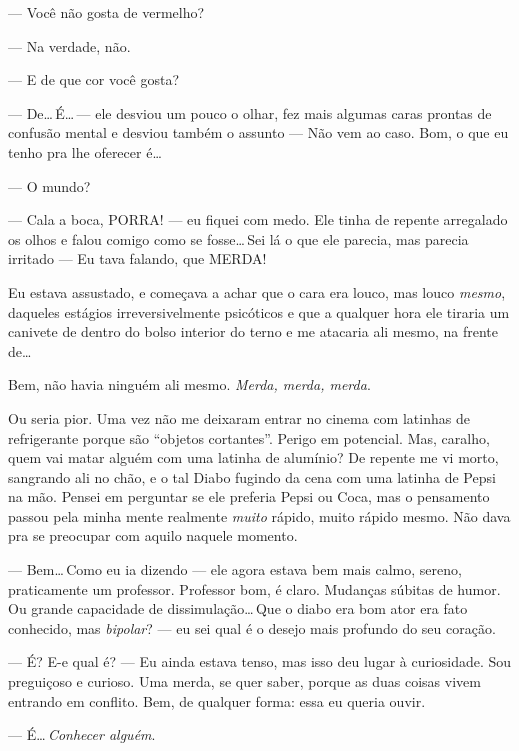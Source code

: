 --- Você não gosta de vermelho?

--- Na verdade, não.

--- E de que cor você gosta?

--- De\ldots\,É\ldots\,--- ele desviou um pouco o olhar, fez mais algumas caras prontas de confusão mental e desviou também o assunto --- Não vem ao caso. Bom, o que eu tenho pra lhe oferecer é\ldots

--- O mundo?

--- Cala a boca, PORRA! --- eu fiquei com medo. Ele tinha de repente arregalado os olhos e falou comigo como se fosse\ldots\,Sei lá o que ele parecia, mas parecia irritado --- Eu tava falando, que MERDA!

Eu estava assustado, e começava a achar que o cara era louco, mas louco \emph{mesmo}, daqueles estágios irreversivelmente psicóticos e que a qualquer hora ele tiraria um canivete de dentro do bolso interior do terno e me atacaria ali mesmo, na frente de\ldots

\begin{sloppypar}
Bem, não havia ninguém ali mesmo. \emph{Merda, merda, merda}.
\end{sloppypar}

Ou seria pior. Uma vez não me deixaram entrar no cinema com latinhas de refrigerante porque são ``objetos cortantes''. Perigo em potencial. Mas, caralho, quem vai matar alguém com uma latinha de alumínio? De repente me vi morto, sangrando ali no chão, e o tal Diabo fugindo da cena com uma latinha de Pepsi na mão. Pensei em perguntar se ele preferia Pepsi ou Coca, mas o pensamento passou pela minha mente realmente \emph{muito} rápido, muito rápido mesmo. Não dava pra se preocupar com aquilo naquele momento.

\begin{sloppypar}
--- Bem\ldots\,Como eu ia dizendo --- ele agora estava bem mais calmo, sereno, praticamente um professor. Professor bom, é claro. Mudanças súbitas de humor. Ou grande capacidade de dissimulação\ldots\,Que o diabo era bom ator era fato conhecido, mas \emph{bipolar}? --- eu sei qual é o desejo mais profundo do seu coração.
\end{sloppypar}

--- É? E-e qual é? --- Eu ainda estava tenso, mas isso deu lugar à curiosidade. Sou preguiçoso e curioso. Uma merda, se quer saber, porque as duas coisas vivem entrando em conflito. Bem, de qualquer forma: essa eu queria ouvir.

--- É\ldots\,\emph{Conhecer alguém}.

